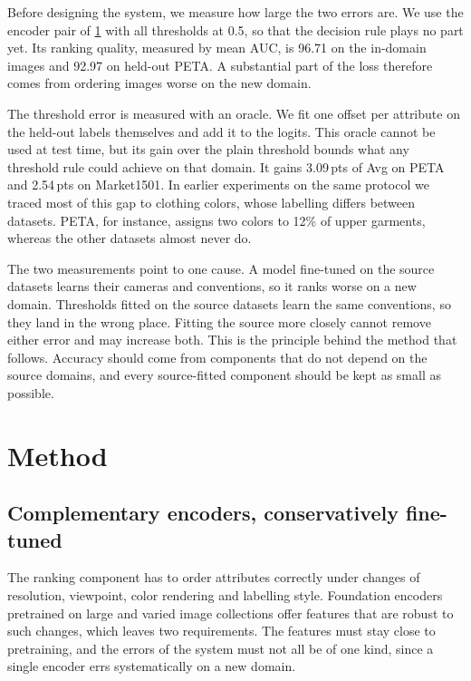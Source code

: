 \documentclass[10pt,twocolumn,letterpaper]{article}
\newcommand{\pts}{\,pts}
\begin{document}
Before designing the system, we measure how large the two errors are. We use the encoder pair of \cref{sec:method} with all thresholds at 0.5, so that the decision rule plays no part yet. Its ranking quality, measured by mean AUC, is 96.71 on the in-domain images and 92.97 on held-out PETA. A substantial part of the loss therefore comes from ordering images worse on the new domain.

The threshold error is measured with an oracle. We fit one offset per attribute on the held-out labels themselves and add it to the logits. This oracle cannot be used at test time, but its gain over the plain threshold bounds what any threshold rule could achieve on that domain. It gains 3.09\pts{} of Avg on PETA and 2.54\pts{} on Market1501. In earlier experiments on the same protocol we traced most of this gap to clothing colors, whose labelling differs between datasets. PETA, for instance, assigns two colors to 12\% of upper garments, whereas the other datasets almost never do.

The two measurements point to one cause. A model fine-tuned on the source datasets learns their cameras and conventions, so it ranks worse on a new domain. Thresholds fitted on the source datasets learn the same conventions, so they land in the wrong place. Fitting the source more closely cannot remove either error and may increase both. This is the principle behind the method that follows. Accuracy should come from components that do not depend on the source domains, and every source-fitted component should be kept as small as possible.

\section{Method}
\label{sec:method}

\subsection{Complementary encoders, conservatively fine-tuned}
\label{sec:encoders}

The ranking component has to order attributes correctly under changes of resolution, viewpoint, color rendering and labelling style. Foundation encoders pretrained on large and varied image collections offer features that are robust to such changes, which leaves two requirements. The features must stay close to pretraining, and the errors of the system must not all be of one kind, since a single encoder errs systematically on a new domain.
\end{document}
